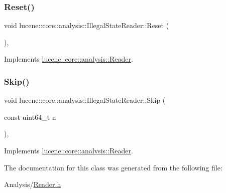 \subsubsection{\texorpdfstring{Reset()}{Reset()}}
{\footnotesize\ttfamily void lucene\+::core\+::analysis\+::\+Illegal\+State\+Reader\+::\+Reset (\begin{DoxyParamCaption}{ }\end{DoxyParamCaption})\hspace{0.3cm}{\ttfamily [inline]}, {\ttfamily [virtual]}}



Implements \mbox{\hyperlink{classlucene_1_1core_1_1analysis_1_1Reader_a5299f5469ce4ea9812ec79a59667945a}{lucene\+::core\+::analysis\+::\+Reader}}.

\mbox{\label{classlucene_1_1core_1_1analysis_1_1IllegalStateReader_aa2a34d98ca51e81297960b13aa0fa18e}} 
\subsubsection{\texorpdfstring{Skip()}{Skip()}}
{\footnotesize\ttfamily void lucene\+::core\+::analysis\+::\+Illegal\+State\+Reader\+::\+Skip (\begin{DoxyParamCaption}\item[{const uint64\+\_\+t}]{n }\end{DoxyParamCaption})\hspace{0.3cm}{\ttfamily [inline]}, {\ttfamily [virtual]}}



Implements \mbox{\hyperlink{classlucene_1_1core_1_1analysis_1_1Reader_a3bd8e9f3e1d07d698bccabde41970219}{lucene\+::core\+::analysis\+::\+Reader}}.



The documentation for this class was generated from the following file\+:\begin{DoxyCompactItemize}
\item 
Analysis/\mbox{\hyperlink{Reader_8h}{Reader.\+h}}\end{DoxyCompactItemize}
